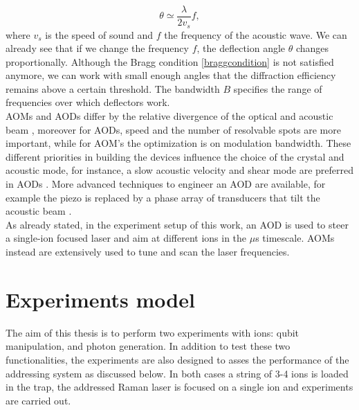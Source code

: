 \begin{equation}
\theta \simeq \frac{\lambda}{2 v_s}f,
\end{equation}
where $v_s$ is the speed of sound and $f$ the frequency of the acoustic wave. We can already see that if we change the frequency $f$, the deflection angle $\theta$ changes proportionally. Although the Bragg condition \eqref{braggcondition} is not satisfied anymore, we can work with small enough angles that the diffraction efficiency remains above a certain threshold. The bandwidth $B$ specifies the range of frequencies over which deflectors work.\\
AOMs and AODs differ by the relative divergence of the optical and acoustic beam \cite{handbookoptics}, moreover for AODs, speed and the number of resolvable spots are more important, while for AOM's the optimization is on modulation bandwidth. These different priorities in building the devices influence
the choice of the crystal and acoustic mode, for instance, a slow acoustic velocity and shear mode are preferred in AODs \cite{handbookoptics}. More advanced techniques to engineer an AOD are available, for example the piezo is replaced by a phase array of transducers that tilt the acoustic beam \cite{phasedarray}.\\
As already stated, in the experiment setup of this work, an AOD is used to steer a single-ion focused laser and aim at different ions in the $\mu$s timescale. AOMs instead are extensively used to tune and scan the laser frequencies.

\section{Experiments model}
The aim of this thesis is to perform two experiments with ions: qubit manipulation, and photon generation. In addition to test these two functionalities, the experiments are also designed to asses the performance of the addressing system as discussed below. In both cases a string of 3-4 ions is loaded in the trap, the addressed Raman laser is focused on a single ion and experiments are carried out.

